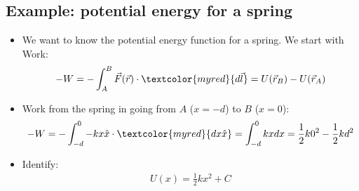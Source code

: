 \documentclass[aspectratio=169,
hyperref={colorlinks,urlcolor=blue}
]{beamer}
\begin{document}
\subsection{Example: potential energy for a spring}
\label{subsec:potentialenergyspringexample}
{
\begin{itemize}
\item We want to know the potential energy function for a spring. We start with Work:
\begin{align*}
-W=-\int_A^B\vec F(\vec r) \cdot \textcolor{myred}{d\vec l}=U(\vec r_B) - U(\vec r_A)
\end{align*}
\item<2-> Work from the spring in going from $A$ ($x=-d$) to $B$ ($x=0$):
\begin{align*}
-W=-\int_{-d}^0 -kx\hat x \cdot \textcolor{myred}{dx\hat x}=\int_{-d}^0kxdx=\frac{1}{2}k0^2-\frac{1}{2}kd^2
\end{align*}
\item<3-> Identify:
\begin{align*}
U(x)=\frac{1}{2}kx^2+C
\end{align*}
\end{itemize}
}
\end{document}

